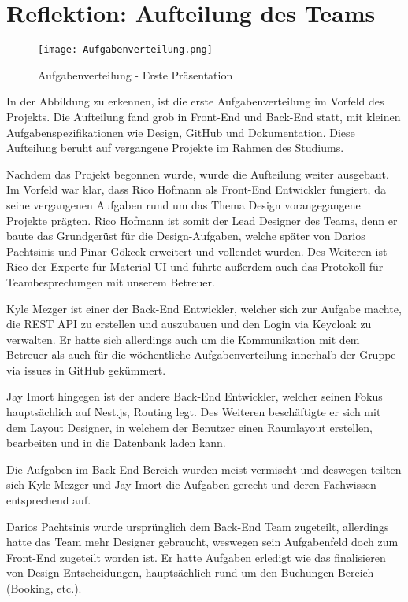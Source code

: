 \section{Reflektion: Aufteilung des Teams}

\begin{figure}[!h]
    \centering
    \texttt{[image: Aufgabenverteilung.png]}
    \caption{Aufgabenverteilung - Erste Präsentation}
    \label{fig:Aufgabenverteilung}
\end{figure}

In der Abbildung zu erkennen, ist die erste Aufgabenverteilung im Vorfeld des Projekts.
Die Aufteilung fand grob in Front-End und Back-End statt, mit kleinen Aufgabenspezifikationen wie Design, GitHub und Dokumentation.
Diese Aufteilung beruht auf vergangene Projekte im Rahmen des Studiums.

Nachdem das Projekt begonnen wurde, wurde die Aufteilung weiter ausgebaut.
Im Vorfeld war klar, dass Rico Hofmann als Front-End Entwickler fungiert, da seine vergangenen Aufgaben rund um das Thema Design vorangegangene Projekte prägten.
Rico Hofmann ist somit der Lead Designer des Teams, denn er baute das Grundgerüst für die Design-Aufgaben, welche später von Darios Pachtsinis und Pinar Gökcek erweitert und vollendet wurden.
Des Weiteren ist Rico der Experte für Material UI und führte außerdem auch das Protokoll für Teambesprechungen mit unserem Betreuer.

Kyle Mezger ist einer der Back-End Entwickler, welcher sich zur Aufgabe machte, die REST API zu erstellen und auszubauen und den Login via Keycloak zu verwalten.
Er hatte sich allerdings auch um die Kommunikation mit dem Betreuer als auch für die wöchentliche Aufgabenverteilung innerhalb der Gruppe via issues in GitHub gekümmert.

Jay Imort hingegen ist der andere Back-End Entwickler, welcher seinen Fokus hauptsächlich auf Nest.js, Routing legt.
Des Weiteren beschäftigte er sich mit dem Layout Designer, in welchem der Benutzer einen Raumlayout erstellen, bearbeiten und in die Datenbank laden kann.

Die Aufgaben im Back-End Bereich wurden meist vermischt und deswegen teilten sich Kyle Mezger und Jay Imort die Aufgaben gerecht und deren Fachwissen entsprechend auf.

Darios Pachtsinis wurde ursprünglich dem Back-End Team zugeteilt, allerdings hatte das Team mehr Designer gebraucht, weswegen sein Aufgabenfeld doch zum Front-End zugeteilt worden ist.
Er hatte Aufgaben erledigt wie das finalisieren von Design Entscheidungen, hauptsächlich rund um den Buchungen Bereich (Booking, etc.).

